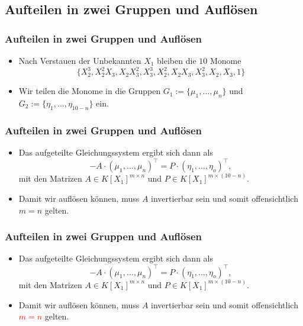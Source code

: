 \documentclass[11pt]{beamer}
\newcommand{\coloneqq}{:=}
\theoremstyle{custom}
\theoremstyle{custom}
\begin{document}
	\subsection*{Aufteilen in zwei Gruppen und Auflösen}
	\begin{frame}
		\frametitle{Aufteilen in zwei Gruppen und Auflösen}
		\begin{itemize}
			\item Nach Verstauen der Unbekannten $X_1$ bleiben die $10$ Monome
			\begin{equation*}
				\lbrace X_2^3,X_2^2X_3,X_2X_3^2,X_3^3,X_2^2,X_2X_3,X_3^2,X_2,X_3,1 \rbrace
			\end{equation*}
			\item Wir teilen die Monome in die Gruppen
			$G_1 \coloneqq \{\mu_1,\ldots,\mu_n\}$ und $G_2 \coloneqq \{\eta_1,\ldots,\eta_{10-n}\}$ ein.
		\end{itemize}
		
	\end{frame}
		\begin{frame}
		\frametitle{Aufteilen in zwei Gruppen und Auflösen}
		\begin{itemize}
			\item Das aufgeteilte Gleichungssystem ergibt sich dann als
			\begin{equation*}
				-A \cdot \left(\mu_1,\ldots,\mu_n\right)^{\top} = P \cdot \left(\eta_1,\ldots,\eta_{o}\right)^{\top},
			\end{equation*}
			mit den Matrizen $A \in K[X_1]^{m \times n}$ und $P \in K[X_1]^{m \times (10-n)}$.

				\item Damit wir auflösen können, muss $A$ invertierbar sein und somit offensichtlich $m=n$ gelten.
		\end{itemize}
	\end{frame}
	\begin{frame}
		\frametitle{Aufteilen in zwei Gruppen und Auflösen}
		\begin{itemize}
			\item Das aufgeteilte Gleichungssystem ergibt sich dann als
			\begin{equation*}
				-A \cdot \left(\mu_1,\ldots,\mu_n\right)^{\top} = P \cdot \left(\eta_1,\ldots,\eta_{o}\right)^{\top},
			\end{equation*}
			mit den Matrizen $A \in K[X_1]^{m \times n}$ und $P \in K[X_1]^{m \times (10-n)}$.
				\item Damit wir auflösen können, muss $A$ invertierbar sein und somit offensichtlich \textcolor{red}{$m=n$} gelten.
		\end{itemize}
	\end{frame}
\end{document}
